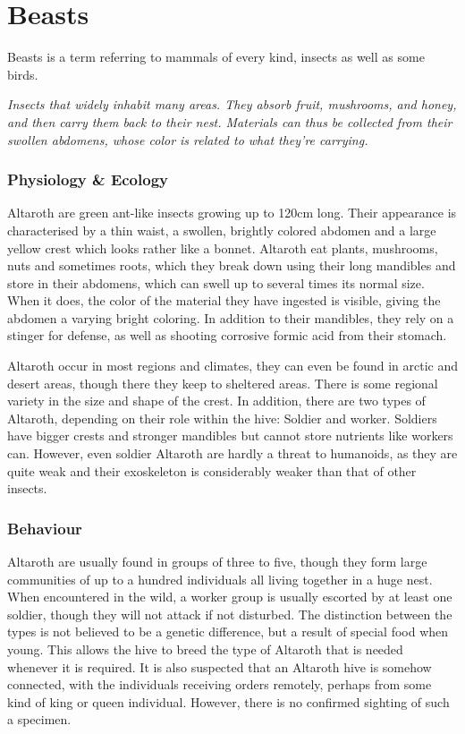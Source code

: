 \let\svaddcontentsline\addcontentsline
\renewcommand\addcontentsline[3]{%
  \ifthenelse{\equal{#1}{lof}}{}%
  {\ifthenelse{\equal{#1}{lot}}{}{\svaddcontentsline{#1}{#2}{#3}}}}

\section{Beasts}
Beasts is a term referring to mammals of every kind, insects as well as some birds.

\textit{Insects that widely inhabit many areas. They absorb fruit, mushrooms, and honey, and then carry them back to their nest. Materials can thus be collected from their swollen abdomens, whose color is related to what they're carrying.}
\subsubsection{Physiology \& Ecology}
Altaroth are green ant-like insects growing up to 120cm long. Their appearance is characterised by a thin waist, a swollen, brightly colored abdomen and a large yellow crest which looks rather like a bonnet. Altaroth eat plants, mushrooms, nuts and sometimes roots, which they break down using their long mandibles and store in their abdomens, which can swell up to several times its normal size. When it does, the color of the material they have ingested is visible, giving the abdomen a varying bright coloring. In addition to their mandibles, they rely on a stinger for defense, as well as shooting corrosive formic acid from their stomach.

Altaroth occur in most regions and climates, they can even be found in arctic and desert areas, though there they keep to sheltered areas. There is some regional variety in the size and shape of the crest. In addition, there are two types of Altaroth, depending on their role within the hive: Soldier and worker. Soldiers have bigger crests and stronger mandibles but cannot store nutrients like workers can. However, even soldier Altaroth are hardly a threat to humanoids, as they are quite weak and their exoskeleton is considerably weaker than that of other insects.

\subsubsection{Behaviour}
Altaroth are usually found in groups of three to five, though they form large communities of up to a hundred individuals all living together in a huge nest. When encountered in the wild, a worker group is usually escorted by at least one soldier, though they will not attack if not disturbed. The distinction between the types is not believed to be a genetic difference, but a result of special food when young. This allows the hive to breed the type of Altaroth that is needed whenever it is required. It is also suspected that an Altaroth hive is somehow connected, with the individuals receiving orders remotely, perhaps from some kind of king or queen individual. However, there is no confirmed sighting of such a specimen.


